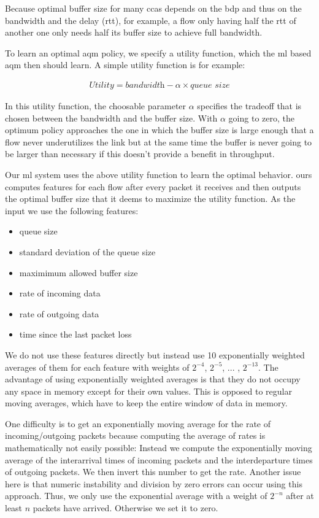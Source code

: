 \documentclass[conference]{IEEEtran}
\begin{document}
Because optimal buffer size for many \glspl{cca} depends on the \gls{bdp} and thus on the bandwidth and the delay (\gls{rtt}), for example, a flow only having half the \gls{rtt} of another one only needs half its buffer size to achieve full bandwidth. 

To learn an optimal \gls{aqm} policy, we specify a utility function, which the \gls{ml} based \gls{aqm} then should learn. A simple utility function is for example:

\begin{align}
\textit{Utility} = \textit{bandwidth}-\alpha\times\textit{queue size}
\label{eq:utility}
\end{align}

In this utility function, the choosable parameter $\alpha$ specifies the tradeoff that is chosen between the bandwidth and the buffer size. With $\alpha$ going to zero, the optimum policy approaches the one in which the buffer size is large enough that a flow never underutilizes the link but at the same time the buffer is never going to be larger than necessary if this doesn't provide a benefit in throughput. 

Our \gls{ml} system uses the above utility function to learn the optimal behavior. \gls{ours} computes features for each flow after every packet it receives and then outputs the optimal buffer size that it deems to maximize the utility function. As the input we use the following features: 
\begin{itemize}
\item queue size
\item standard deviation of the queue size 
\item maximimum allowed buffer size
\item rate of incoming data
\item rate of outgoing data
\item time since the last packet loss
\end{itemize}
We do not use these features directly but instead use 10 exponentially weighted averages of them for each feature with weights of $2^{-4}$, $2^{-5}$, ... , $2^{-13}$. The advantage of using exponentially weighted averages is that they do not occupy any space in memory except for their own values. This is opposed to regular moving averages, which have to keep the entire window of data in memory. 

One difficulty is to get an exponentially moving average for the rate of incoming/outgoing packets because computing the average of rates is mathematically not easily possible: Instead we compute the exponentially moving average of the interarrival times of incoming packets and the interdeparture times of outgoing packets. We then invert this number to get the rate. Another issue here is that numeric instability and division by zero errors can occur using this approach. Thus, we only use the exponential average with a weight of $2^{-n}$ after at least $n$ packets have arrived. Otherwise we set it to zero. 
\end{document}
